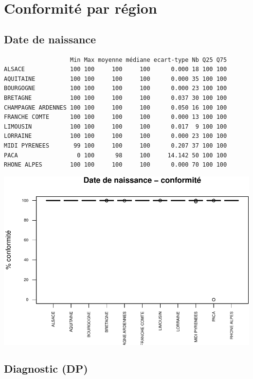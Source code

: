 \documentclass[]{article}
\begin{document}
\section{Conformité par région}\label{conformite-par-region}

\subsection{Date de naissance}\label{date-de-naissance-1}

\begin{verbatim}
                   Min Max moyenne médiane ecart-type Nb Q25 Q75
ALSACE             100 100     100     100      0.000 18 100 100
AQUITAINE          100 100     100     100      0.000 35 100 100
BOURGOGNE          100 100     100     100      0.000 23 100 100
BRETAGNE           100 100     100     100      0.037 30 100 100
CHAMPAGNE ARDENNES 100 100     100     100      0.050 16 100 100
FRANCHE COMTE      100 100     100     100      0.000 13 100 100
LIMOUSIN           100 100     100     100      0.017  9 100 100
LORRAINE           100 100     100     100      0.000 23 100 100
MIDI PYRENEES       99 100     100     100      0.207 37 100 100
PACA                 0 100      98     100     14.142 50 100 100
RHONE ALPES        100 100     100     100      0.000 70 100 100
\end{verbatim}

\includegraphics{septembre2015_files/figure-latex/unnamed-chunk-29-1.pdf}

\subsection{Diagnostic (DP)}\label{diagnostic-dp-1}
\end{document}
